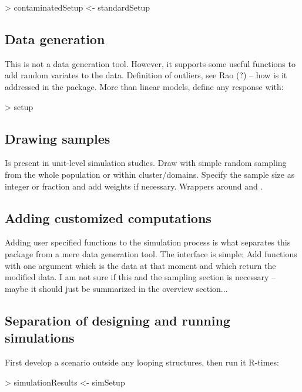 \documentclass[article]{ajs}
\begin{document}
\begin{Schunk}
\begin{Sinput}
> contaminatedSetup <- standardSetup %>% sim_gen_cont()
\end{Sinput}
\end{Schunk}

\subsection{Data generation}
This is not a data generation tool. However, it supports some useful functions to add random variates to the data. Definition of outliers, see Rao (?) -- how is it addressed in the package. More than linear models, define any response with:
\begin{Schunk}
\begin{Sinput}
> setup %>% sim_resp_eq(y = g(2 * x) + e)
\end{Sinput}
\end{Schunk}

\subsection{Drawing samples}
Is present in unit-level simulation studies. Draw with simple random sampling from the whole population or within cluster/domains. Specify the sample size as integer or fraction and add weights if necessary. Wrappers around  and .

\subsection{Adding customized computations}
Adding user specified functions to the simulation process is what separates this package from a mere data generation tool. The interface is simple: Add functions with one argument which is the data at that moment and which return the modified data. I am not sure if this and the sampling section is necessary -- maybe it should just be summarized in the overview section...

\subsection{Separation of designing and running simulations}
First develop a scenario outside any looping structures, then run it R-times:

\begin{Schunk}
\begin{Sinput}
> simulationResults <- simSetup %>% sim(R = 500)
\end{Sinput}
\end{Schunk}
\end{document}
